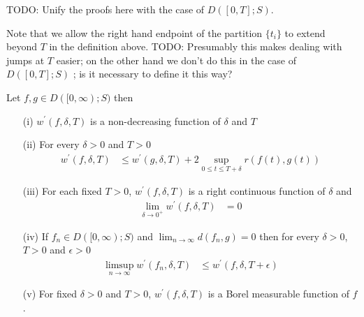TODO: Unify the proofs here with the case of $D([0,T];S)$.

Note that we allow the right hand endpoint of the partition $\lbrace t_i \rbrace$ to extend beyond $T$ in the definition above.  TODO: Presumably this makes dealing with jumps
at $T$ easier; on the other hand we don't do this in the case of $D([0,T];S)$ ; is it necessary to define it this way?
\begin{lem}\label{SkorohodInfiniteJ1ModulusOfContinuity}
Let $f, g\in D([0,\infty); S)$ then 
\begin{itemize}
\item[(i)] $w^\prime(f,\delta, T)$ is a non-decreasing function of $\delta$ and $T$
\item[(ii)] For every $\delta > 0$ and $T > 0$
\begin{align*}
w^\prime(f,\delta, T) &\leq w^\prime(g,\delta, T) + 2 \sup_{0 \leq t \leq T+ \delta} r(f(t), g(t))
\end{align*}
\item[(iii)]For each fixed $T > 0$, $w^\prime(f,\delta, T)$ is a right continuous function of $\delta$ and
\begin{align*}
\lim_{\delta \to 0^+} w^\prime(f,\delta, T) &= 0
\end{align*}
\item[(iv)]If $f_n \in D([0,\infty); S)$ and $\lim_{n \to \infty} d(f_n,g) = 0$ then for every $\delta > 0$, $T > 0$ and $\epsilon > 0$ 
\begin{align*}
\limsup_{n \to \infty}  w^\prime(f_n,\delta, T)  &\leq  w^\prime(f,\delta, T+\epsilon) 
\end{align*}
\item[(v)]For fixed $\delta > 0$ and $T>0$, $ w^\prime(f,\delta, T)$ is a Borel measurable function of $f$.
\end{itemize}
\end{lem}

